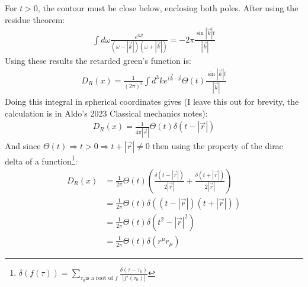 \documentclass[12pt,a4]{article}
\begin{document}
\begin{enumerate}
\begin{enumerate}
        For $t > 0$, the contour must be close below, enclosing both poles. After using the residue theorem:
        \begin{align*}
          \int d \omega \frac{e^{i \omega t}}{(\omega - |\vec{k}|)( \omega + |\vec{k}|)} = - 2 \pi \frac{\sin |\vec{k}| t}{|\vec{k}|}
        \end{align*}
        Using these results the retarded green's function is:
        \begin{align*}
          D_R (x) = \frac{1}{(2 \pi)^3}\int d^3 k e^{i \vec{k} \cdot \vec{x}}\Theta(t) \frac{\sin |\vec{k}| t}{|\vec{k}|}
        \end{align*}
        Doing this integral in spherical coordinates gives (I leave this out for brevity, the calculation is in Aldo's 2023 Classical mechanics notes):
        \begin{align*}
          D_R (x) = \frac{1}{4 \pi |\vec{r}|}\Theta(t) \delta(t - |\vec{r}|)
        \end{align*}
        And since $\Theta(t) \Rightarrow t >0 \Rightarrow t + |\vec{r}| \neq 0$ then using the property of the dirac delta of a function\footnote{$\displaystyle \delta(f(\tau)) = \sum_{\tau_0 \text{is a root of } f}\frac{\delta(\tau - \tau_0)}{|f'(\tau_0)|}$}:
        \begin{align*}
          D_R (x) &= \frac{1}{2 \pi }\Theta(t) \left(\frac{\delta(t - |\vec{r}|)}{2|\vec{r}|} + \frac{\delta(t + |\vec{r}|)}{2|\vec{r}|}\right)\\
                  &= \frac{1}{2 \pi }\Theta(t) \delta((t - |\vec{r}|)(t + |\vec{r}|))\\
                  &= \frac{1}{2 \pi }\Theta(t) \delta(t^2 - |\vec{r}|^2)\\
                  &= \frac{1}{2 \pi }\Theta(t) \delta(r^\mu r_\mu)
        \end{align*}


\end{enumerate}
\end{enumerate}
\end{document}
